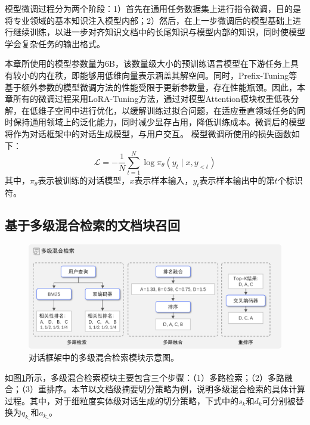 模型微调过程分为两个阶段：1）首先在通用任务数据集上进行指令微调，目的是将专业领域的基本知识注入模型内部；2）然后，在上一步微调后的模型基础上进行继续训练，以进一步对齐知识文档中的长尾知识与模型内部的知识，同时使模型学会复杂任务的输出格式。

本章所使用的模型参数量为6B，该数量级大小的预训练语言模型在下游任务上具有较小的内在秩，即能够用低维向量表示涵盖其解空间。同时，Prefix-Tuning等基于额外参数的模型微调方法的性能受限于更新参数量，存在性能瓶颈。因此，本章所有的微调过程采用LoRA-Tuning方法，通过对模型Attention模块权重低秩分解，在低维子空间中进行优化，以缓解训练过拟合问题，在适应垂直领域任务的同时保持通用领域上的泛化能力，同时减少显存占用，降低训练成本。微调后的模型将作为对话框架中的对话生成模型，与用户交互。
模型微调所使用的损失函数如下：
\begin{equation}
	\mathcal{L}=-\frac{1}{N} \sum_{t=1}^N \log \pi_\theta\left(y_t \mid x, y_{<t}\right)
\end{equation}
其中，$\pi_\theta$表示被训练的对话模型，$x$表示样本输入，$y_t$表示样本输出中的第$t$个标识符。

\subsection{基于多级混合检索的文档块召回}

\begin{figure}[htbp]
	\centering
	\includegraphics[scale=0.55]{Fig/search_module.png}
	\caption{\label{search_module}对话框架中的多级混合检索模块示意图。}
\end{figure}

如图\ref{search_module}所示，多级混合检索模块主要包含三个步骤：（1）多路检索；（2）多路融合；（3）重排序。本节以文档级摘要切分策略为例，说明多级混合检索的具体计算过程。其中，对于细粒度实体级对话生成的切分策略，下式中的$s_k$和$d_k$可分别被替换为$q_{k\_}$和$a_{k\_}$。

